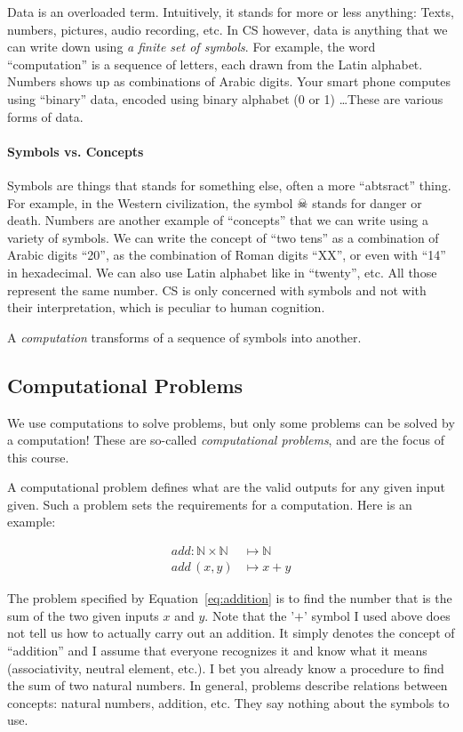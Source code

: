 \documentclass{aldast}
\begin{document}
Data is an overloaded term. Intuitively, it stands for more or less
anything: Texts, numbers, pictures, audio recording, etc. In CS
however, data is anything that we can write down using \emph{a finite
  set of symbols}. For example, the word ``computation'' is a sequence
of letters, each drawn from the Latin alphabet. Numbers shows up as
combinations of Arabic digits. Your smart phone computes using
``binary'' data, encoded using binary alphabet (0 or 1) \dots These are
various forms of data.

\paragraph{Symbols vs. Concepts} Symbols are things that stands for
something else, often a more ``abtsract'' thing. For example, in the
Western civilization, the symbol $\skull$ stands for danger or
death. Numbers are another example of ``concepts'' that we can write
using a variety of symbols. We can write the concept of ``two tens''
as a combination of Arabic digits ``20'', as the combination of Roman
digits ``XX'', or even with ``14'' in hexadecimal. We can also use
Latin alphabet like in ``twenty'', etc. All those represent the same
number. CS is only concerned with symbols and not with their
interpretation, which is peculiar to human cognition.

\begin{takeaway}
  A \emph{computation} transforms of a sequence of symbols into
  another.
\end{takeaway}

\subsection{Computational Problems}
We use computations to solve problems, but only some problems can be
solved by a computation! These are so-called \emph{computational
  problems}, and are the focus of this course.

A computational problem defines what are the valid outputs for any
given input given. Such a problem sets the requirements
for a computation. Here is an example:

\begin{align}
  add: \mathbb{N} \times \mathbb{N} &\mapsto \mathbb{N} \nonumber \\
  add\, (x, y) & \mapsto x + y
  \label{eq:addition}
\end{align}

The problem specified by Equation~\ref{eq:addition} is to find the
number that is the sum of the two given inputs $x$ and $y$. Note that
the '$+$' symbol I used above does not tell us how to actually carry
out an addition. It simply denotes the concept of ``addition'' and I
assume that everyone recognizes it and know what it means
(associativity, neutral element, etc.). I bet you already know a
procedure to find the sum of two natural numbers. In general, problems
describe relations between concepts: natural numbers, addition,
etc. They say nothing about the symbols to use.
\end{document}
